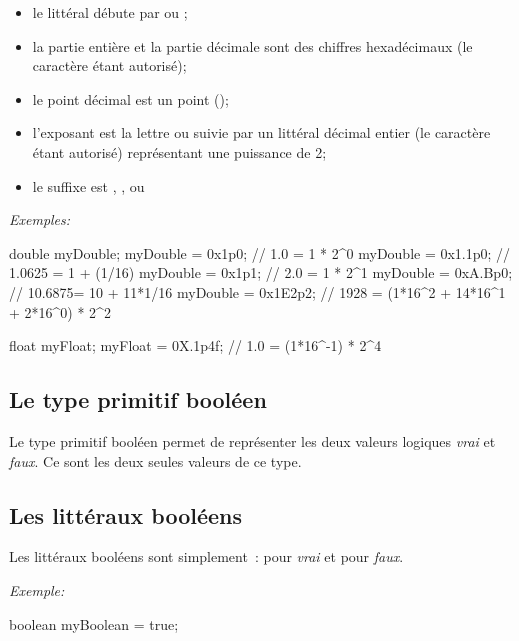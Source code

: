 \begin{itemize}

	\item le littéral débute par  ou ;

	\item la partie entière et la partie décimale sont des chiffres hexadécimaux
		(le caractère \pc{\_} étant autorisé);

	\item le point décimal est un point ();

	\item l'exposant est la lettre  ou  suivie par un littéral
		décimal entier (le caractère \pc{\_} étant autorisé) représentant une 
		puissance de 2;

	\item le suffixe est , ,  ou 

\end{itemize}

\textit{Exemples:}
\begin{java}
	double myDouble;
	myDouble = 0x1p0;		// 1.0 = 1 * 2^0
	myDouble = 0x1.1p0;	// 1.0625 = 1 + (1/16)
	myDouble = 0x1p1;		// 2.0 = 1 * 2^1
	myDouble = 0xA.Bp0; // 10.6875= 10 + 11*1/16
	myDouble = 0x1E2p2; // 1928 = (1*16^2 + 14*16^1 + 2*16^0) * 2^2

	float myFloat;
	myFloat = 0X.1p4f;		// 1.0 = (1*16^-1) * 2^4

\end{java}




\subsection{Le type primitif booléen}

Le type primitif booléen permet de représenter les deux valeurs logiques
\textit{vrai} et \textit{faux}. Ce sont les deux seules valeurs de ce type. 


\subsection{Les littéraux booléens}

Les littéraux booléens sont simplement~:  pour \textit{vrai} et
 pour \textit{faux}. 

\pagebreak[2]
\textit{Exemple:}
\nopagebreak
\begin{java}
	boolean myBoolean = true;
\end{java}











